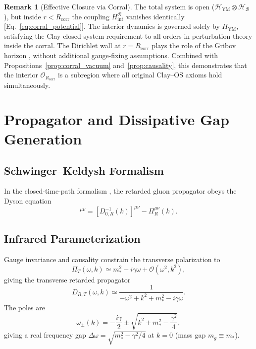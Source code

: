 \documentclass[12pt,a4paper]{article}
\theoremstyle{definition}
\newtheorem{remark}[theorem]{Remark}
\newcommand{\YM}{\mathrm{YM}}
\newcommand{\hilb}{\mathscr{H}}
\newcommand{\Rcorr}{R_{\mathrm{corr}}}
\newcommand{\bath}{\mathcal{B}}
\begin{document}
\begin{remark}[Effective Closure via Corral]
\label{rem:effective_closure}
The total system is open ($\hilb_{\YM} \otimes \hilb_{\bath}$), but
inside $r < \Rcorr$ the coupling $H_{\mathrm{int}}^{\mathcal{R}}$
vanishes identically [Eq.~\eqref{eq:corral_potential}]. The interior
dynamics is governed solely by $H_{\YM}$, satisfying the Clay
closed-system requirement to all orders in perturbation theory inside
the corral. The Dirichlet wall at $r = \Rcorr$ plays the role of the
Gribov horizon \cite{Gribov1978}, without additional gauge-fixing
assumptions. Combined with Propositions~\ref{prop:corral_vacuum}
and~\ref{prop:causality}, this demonstrates that the interior
$\mathcal{O}_{\Rcorr}$ is a subregion where all original Clay--OS axioms
hold simultaneously.
\end{remark}

\section{Propagator and Dissipative Gap Generation}
\label{sec:propagator}

\subsection{Schwinger--Keldysh Formalism}

In the closed-time-path formalism \cite{Keldysh}, the retarded gluon
propagator obeys the Dyson equation
\begin{equation}
  [D_{R}^{-1}(k)]^{\mu\nu}
  = [D_{0,R}^{-1}(k)]^{\mu\nu} - \Pi_{R}^{\mu\nu}(k).
  \label{eq:dyson}
\end{equation}

\subsection{Infrared Parameterization}

Gauge invariance and causality constrain the transverse polarization to
\begin{equation}
  \Pi_{T}(\omega, k)
  \simeq m_{*}^{2} - i\gamma\omega
  + \mathcal{O}(\omega^{2}, k^{2}),
  \label{eq:PI_T}
\end{equation}
giving the transverse retarded propagator
\begin{equation}
  D_{R,T}(\omega, k)
  \simeq \frac{1}{-\omega^{2} + k^{2} + m_{*}^{2} - i\gamma\omega}.
  \label{eq:prop}
\end{equation}
The poles are
\begin{equation}
  \omega_{\pm}(k)
  = -\frac{i\gamma}{2}
  \pm \sqrt{k^{2} + m_{*}^{2} - \frac{\gamma^{2}}{4}},
  \label{eq:poles}
\end{equation}
giving a real frequency gap $\Delta\omega = \sqrt{m_{*}^{2} - \gamma^{2}/4}$
at $k = 0$ (mass gap $m_{g} \equiv m_{*}$).
\end{document}

